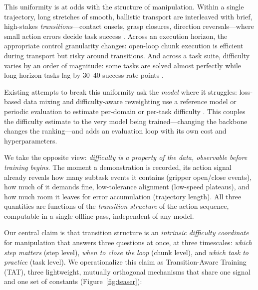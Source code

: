 \documentclass[letterpaper]{article} %
\newcommand{\method}{TAT} %
\begin{document}
This uniformity is at odds with the structure of manipulation. Within a single trajectory, long stretches of smooth, ballistic transport are interleaved with brief, high-stakes \emph{transitions}---contact onsets, grasp closures, direction reversals---where small action errors decide task success \cite{chi2023diffusion,zhao2023aloha}. Across an execution horizon, the appropriate control granularity changes: open-loop chunk execution is efficient during transport but risky around transitions. And across a task suite, difficulty varies by an order of magnitude: some tasks are solved almost perfectly while long-horizon tasks lag by 30--40 success-rate points \cite{liu2023libero,kim2024openvla}.

Existing attempts to break this uniformity ask the \emph{model} where it struggles: loss-based data mixing and difficulty-aware reweighting use a reference model or periodic evaluation to estimate per-domain or per-task difficulty \cite{hejna2024remix,schaul2016prioritized,lin2017focal}. This couples the difficulty estimate to the very model being trained---changing the backbone changes the ranking---and adds an evaluation loop with its own cost and hyperparameters.

We take the opposite view: \emph{difficulty is a property of the data, observable before training begins}. The moment a demonstration is recorded, its action signal already reveals how many subtask events it contains (gripper open/close events), how much of it demands fine, low-tolerance alignment (low-speed plateaus), and how much room it leaves for error accumulation (trajectory length). All three quantities are functions of the \emph{transition structure} of the action sequence, computable in a single offline pass, independent of any model.

Our central claim is that transition structure is an \emph{intrinsic difficulty coordinate} for manipulation that answers three questions at once, at three timescales:
\emph{which step matters} (step level), \emph{when to close the loop} (chunk level), and \emph{which task to practice} (task level).
We operationalize this claim as Transition-Aware Training (\method{}), three lightweight, mutually orthogonal mechanisms that share one signal and one set of constants (Figure~\ref{fig:teaser}):
\end{document}
